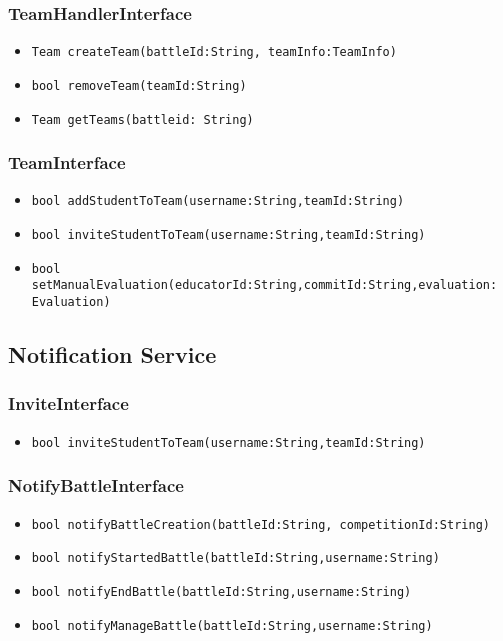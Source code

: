 \subsubsection{TeamHandlerInterface}
\begin{itemize}
    \item \texttt{Team createTeam(battleId:String, teamInfo:TeamInfo)}
    \item \texttt{bool removeTeam(teamId:String)}
    \item \texttt{Team getTeams(battleid: String)}%
\end{itemize}

\subsubsection{TeamInterface}
\begin{itemize}
    \item \texttt{bool addStudentToTeam(username:String,teamId:String)}%
    \item \texttt{bool inviteStudentToTeam(username:String,teamId:String)}%
    \item \texttt{bool setManualEvaluation(educatorId:String,commitId:String,evaluation: Evaluation)}%
\end{itemize}


\subsection{Notification Service}
\subsubsection{InviteInterface}
\begin{itemize}
    \item \texttt{bool inviteStudentToTeam(username:String,teamId:String)}%
\end{itemize}

\subsubsection{NotifyBattleInterface}
\begin{itemize}
    \item \texttt{bool notifyBattleCreation(battleId:String, competitionId:String)}%
    \item \texttt{bool notifyStartedBattle(battleId:String,username:String)}
    \item \texttt{bool notifyEndBattle(battleId:String,username:String)}
    \item \texttt{bool notifyManageBattle(battleId:String,username:String)}
\end{itemize}

